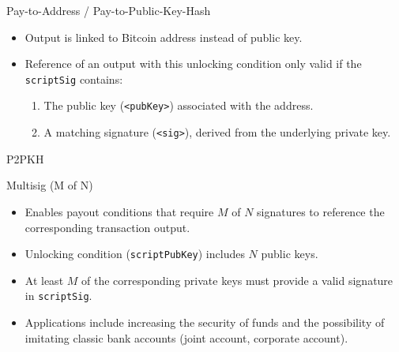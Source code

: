\documentclass[]{beamer}
\begin{document}
\begin{frame}{Pay-to-Address / Pay-to-Public-Key-Hash}
\vspace{1em}
\begin{itemize}
	\item<2-> Output is linked to Bitcoin address instead of public key.
	\item<3-> Reference of an output with this unlocking condition only valid if the \texttt{scriptSig} contains:
	
	\begin{enumerate}
	 \item<4-> The public key (\texttt{<pubKey>}) associated with the address.
	 \item<4-> A matching signature (\texttt{<sig>}), derived from the underlying private key.
	\end{enumerate}
\end{itemize}
\end{frame}


\begin{frame}{P2PKH}
	
\begin{figure}
\centering
 
\end{figure}

\end{frame}

\begin{frame}{Multisig (M of N)}
\vspace{1em}
\begin{itemize}
  \item Enables payout conditions that require $M$ of $N$ signatures to reference the corresponding transaction output.
  \item<2-> Unlocking condition (\texttt{scriptPubKey}) includes $N$ public keys.
  \item<3-> At least $M$ of the corresponding private keys must provide a valid signature in \texttt{scriptSig}.
  \item<4-> Applications include increasing the security of funds and the possibility of imitating classic bank accounts (joint account, corporate account).
\end{itemize}
\end{frame}
\end{document}
